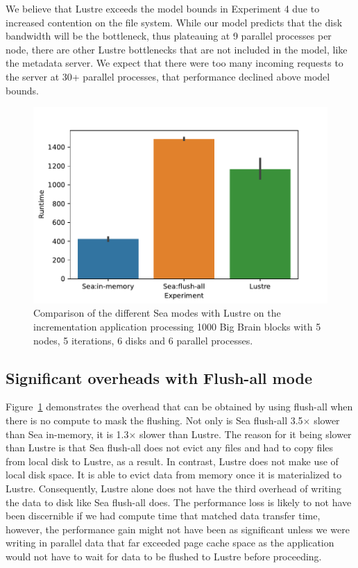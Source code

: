 \documentclass[10pt,journal,compsoc]{IEEEtran}
\begin{document}
      We believe that Lustre exceeds the model bounds in Experiment 4 due to
      increased contention on the file system. While our model predicts that the
      disk bandwidth will be the bottleneck, thus plateauing at 9 parallel
      processes per node, there are other Lustre bottlenecks that are not
      included in the model, like the metadata server. We expect that there were
      too many incoming requests to the server at 30+ parallel processes, that
      performance declined above model bounds. 
      

    \begin{figure}

        \centering
        \includegraphics[width=\columnwidth]{figures/flushall.pdf}%
        \caption{Comparison of the different Sea modes with Lustre on the
        incrementation application processing 1000 Big Brain blocks with 5
        nodes, 5 iterations, 6 disks and 6 parallel processes.}
    \label{fig:sea-comp:flush}
    \end{figure}

      \subsection{Significant overheads with Flush-all mode}

      Figure~\ref{fig:sea-comp:flush} demonstrates the overhead that can be
      obtained by using flush-all when there is no compute to mask the flushing.
      Not only is Sea flush-all 3.5$\times$ slower than Sea in-memory, it is
      1.3$\times$ slower than Lustre. The reason for it being slower than Lustre
      is that Sea flush-all does not evict any files and had to copy files from
      local disk to Lustre, as a result. In contrast, Lustre does not make use
      of local disk space. It is able to evict data from memory once it is
      materialized to Lustre. Consequently, Lustre alone does not have the third
      overhead of writing the data to disk like Sea flush-all does. The
      performance loss is likely to not have been discernible if we had compute
      time that matched data transfer time, however, the performance gain might
      not have been as significant unless we were writing in parallel data that
      far exceeded page cache space as the application would not have to wait
      for data to be flushed to Lustre before proceeding.
\end{document}
